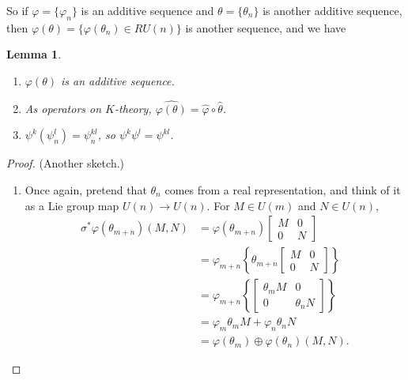 \documentclass{article}
\newtheorem{lem}[thm]{Lemma}
\begin{document}
So if $\varphi = \{\varphi_n\}$ is an additive sequence and $\theta = \{ \theta_n \}$ is another additive sequence, then $\varphi(\theta) = \{ \varphi(\theta_n) \in RU(n)\}$ is another sequence, and we have
\begin{lem}
\begin{enumerate}
\item $\varphi(\theta)$ is an additive sequence.
\item As operators on $K$-theory, $\widehat{\varphi(\theta)} = \hat \varphi \circ \hat \theta$.
\item $\psi^k(\psi^l_n) = \psi^{kl}_n$, so $\psi^k \psi^l = \psi^{kl}$.
\end{enumerate}
\end{lem}
\begin{proof}
(Another sketch.)
\begin{enumerate}
\item Once again, pretend that $\theta_n$ comes from a real representation, and think of it as a Lie group map $U(n) \to U(n)$.  For $M \in U(m)$ and $N \in U(n)$,
\begin{align*}
\sigma^* \varphi(\theta_{m+n})(M, N) & = \varphi(\theta_{m+n}) \left[ \begin{array}{c|c} M & 0 \\ \hline 0 & N\end{array}\right] \\
& = \varphi_{m+n} \left\{ \theta_{m+n} \left[ \begin{array}{c|c} M & 0 \\ \hline 0 & N\end{array}\right] \right\} \\
& = \varphi_{m+n} \left\{ \left[ \begin{array}{c|c} \theta_m M & 0 \\ \hline 0 & \theta_n N \end{array}\right] \right\} \\
& = \varphi_m \theta_m M + \varphi_n \theta_n N \\
& = \varphi(\theta_m) \oplus \varphi(\theta_n) (M, N).
\end{align*}

\end{enumerate}
\end{proof}
\end{document}
